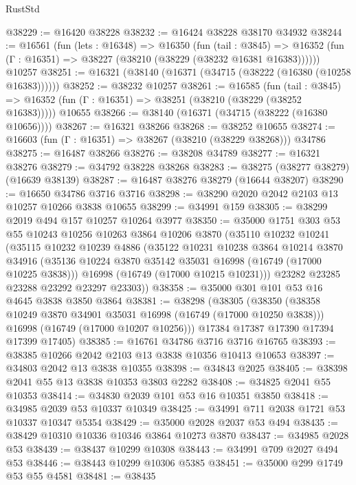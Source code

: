 \begin{lexlean}{RustStd}
\begin{coremodule}
@38229 := @16420 @38228
@38232 := @16424 @38228 @38170 @34932
@38244 := @16561
    (fun (lets : @16348) =>
    @16350
      (fun (tail : @3845) =>
      @16352 (fun (Γ : @16351) => @38227 (@38210 (@38229 (@38232 @16381 @16383))))))
    @10257
@38251 := @16321 (@38140 (@16371 (@34715 (@38222 (@16380 (@10258 @16383))))))
@38252 := @38232 @10257
@38261 := @16585
    (fun (tail : @3845) => @16352 (fun (Γ : @16351) => @38251 (@38210 (@38229 (@38252 @16383)))))
    @10655
@38266 := @38140 (@16371 (@34715 (@38222 (@16380 @10656))))
@38267 := @16321 @38266
@38268 := @38252 @10655
@38274 := @16603 (fun (Γ : @16351) => @38267 (@38210 (@38229 @38268))) @34786
@38275 := @16487 @38266
@38276 := @38208 @34789
@38277 := @16321 @38276
@38279 := @34792 @38228 @38268
@38283 := @38275 (@38277 @38279) (@16639 @38139)
@38287 := @16487 @38276 @38279 (@16644 @38207)
@38290 := @16650 @34786 @3716 @3716
@38298 := @38290 @2020 @2042 @2103 @13 @10257 @10266 @3838 @10655
@38299 := @34991 @159
@38305 := @38299 @2019 @494 @157 @10257 @10264 @3977
@38350 := @35000
    @1751
    @303
    @53
    @55
    @10243
    @10256
    @10263
    @3864
    @10206
    @3870
    (@35110
      @10232
      @10241
      (@35115
        @10232
        @10239
        @4886
        (@35122
          @10231
          @10238
          @3864
          @10214
          @3870
          @34916
          (@35136 @10224 @3870 @35142 @35031 @16998 (@16749 (@17000 @10225 @3838)))
          @16998
          (@16749 (@17000 @10215 @10231)))
        @23282
        @23285
        @23288
        @23292
        @23297
        @23303))
@38358 := @35000 @301 @101 @53 @16 @4645 @3838 @3850 @3864
@38381 := @38298
    (@38305
      (@38350
        (@38358 @10249 @3870 @34901 @35031 @16998 (@16749 (@17000 @10250 @3838)))
        @16998
        (@16749 (@17000 @10207 @10256)))
      @17384
      @17387
      @17390
      @17394
      @17399
      @17405)
@38385 := @16761 @34786 @3716 @3716 @16765
@38393 := @38385 @10266 @2042 @2103 @13 @3838 @10356 @10413 @10653
@38397 := @34803 @2042 @13 @3838 @10355
@38398 := @34843 @2025
@38405 := @38398 @2041 @55 @13 @3838 @10353 @3803 @2282
@38408 := @34825 @2041 @55 @10353
@38414 := @34830 @2039 @101 @53 @16 @10351 @3850
@38418 := @34985 @2039 @53 @10337 @10349
@38425 := @34991 @711 @2038 @1721 @53 @10337 @10347 @5354
@38429 := @35000 @2028 @2037 @53 @494
@38435 := @38429 @10310 @10336 @10346 @3864 @10273 @3870
@38437 := @34985 @2028 @53
@38439 := @38437 @10299 @10308
@38443 := @34991 @709 @2027 @494 @53
@38446 := @38443 @10299 @10306 @5385
@38451 := @35000 @299 @1749 @53 @55 @4581
@38481 := @38435

\end{coremodule}
\end{lexlean}
